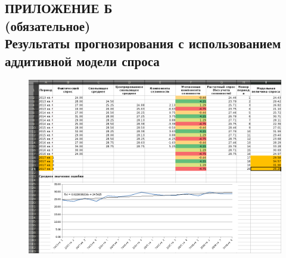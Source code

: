\renewcommand{\thefigure}{\Asbuk{section}.\arabic{figure}}
\renewcommand{\thetable}{\Asbuk{section}.\arabic{table}}
\renewcommand{\thelstlisting}{\Asbuk{section}.\arabic{lstlisting}}

\begin{landscape}
\section*{%
  ПРИЛОЖЕНИЕ Б \\
  (обязательное) \\
  Результаты прогнозирования с использованием
  аддитивной модели спроса
}

\pagestyle{fancy}
\fancyhf{}  %
\fancyfoot[R]{\thepage}
\renewcommand{\headrulewidth}{0pt}
\renewcommand{\footrulewidth}{0pt}

\setlength{\headheight}{10mm}
\setlength{\headsep}{\baselineskip}

\thispagestyle{plain}

\setcounter{section}{1}
\setcounter{figure}{0}
\setcounter{table}{0}
\setcounter{lstlisting}{0}

\begin{figure}[h!]
  \centering
  \includegraphics[width=170mm]{pic/additive}
\end{figure}

\end{landscape}
